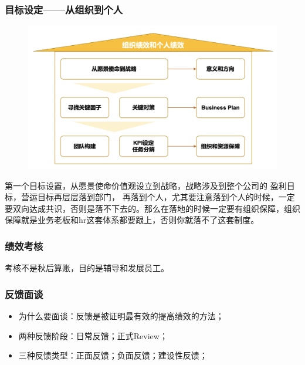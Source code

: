 \documentclass[12pt]{article}
\begin{document}
\subsubsection{目标设定——从组织到个人}
\begin{figure}[H]
    \centering
    \includegraphics[width=.6\textwidth]{fig/Ali_Performance_5.png}
\end{figure}

第一个目标设置，从愿景使命价值观设立到战略，战略涉及到整个公司的 盈利目标，营运目标再层层落到部门， 再落到个人，尤其要注意落到个人的时候，一定要双向达成共识，否则是落不下去的。那么在落地的时候一定要有组织保障，组织保障就是业务老板和hr这套体系都要跟上，否则你就落不了这套制度。

\subsubsection{绩效考核}
考核不是秋后算账，目的是辅导和发展员工。

\subsubsection{反馈面谈}
\begin{itemize}
\setlength{\itemsep}{0pt}
\setlength{\parsep}{0pt}
\setlength{\parskip}{0pt}
    \item 为什么要面谈：反馈是被证明最有效的提高绩效的方法；
    \item 两种反馈阶段：日常反馈；正式Review；
    \item 三种反馈类型：正面反馈；负面反馈；建设性反馈；
\end{itemize}
\end{document}
